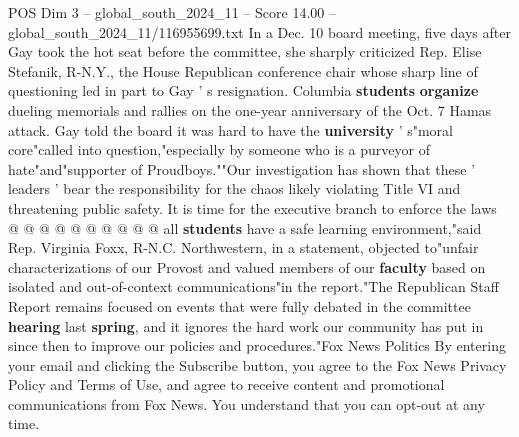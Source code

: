 \begin{textsample}{POS Dim 3 – global\_south\_2024\_11 – Score 14.00 – global\_south\_2024\_11/116955699.txt}
In a Dec. 10 board meeting, five days after Gay took the hot seat before the committee, she sharply criticized Rep.
Elise Stefanik, R-N.Y., the House Republican conference chair whose sharp line of questioning led in part to Gay ' s resignation.
Columbia \textbf{students} \textbf{organize} dueling memorials and rallies on the one-year anniversary of the Oct. 7 Hamas attack.
Gay told the board it was hard to have the \textbf{university} ' s"moral core"called into question,"especially by someone who is a purveyor of hate"and"supporter of Proudboys.""Our investigation has shown that these ' leaders ' bear the responsibility for the chaos likely violating Title VI and threatening public safety.
It is time for the executive branch to enforce the laws @ @ @ @ @ @ @ @ @ @ all \textbf{students} have a safe learning environment,"said Rep.
Virginia Foxx, R-N.C.
Northwestern, in a statement, objected to"unfair characterizations of our Provost and valued members of our \textbf{faculty} based on isolated and out-of-context communications"in the report."The Republican Staff Report remains focused on events that were fully debated in the committee \textbf{hearing} last \textbf{spring}, and it ignores the hard work our community has put in since then to improve our policies and procedures."Fox News Politics By entering your email and clicking the Subscribe button, you agree to the Fox News Privacy Policy and Terms of Use, and agree to receive content and promotional communications from Fox News.
You understand that you can opt-out at any time.

\end{textsample}
